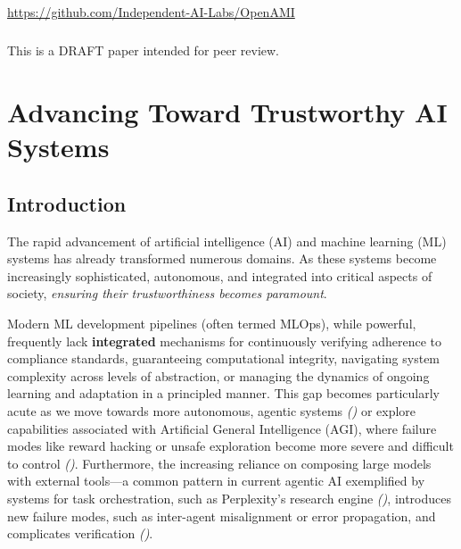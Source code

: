\documentclass[12pt,a4paper]{report}
\renewcommand{\citep}[1]{\textit{\scriptsize{(\cite{#1})}}}
\begin{document}
\begin{titlepage}
\begin{center}
			\paragraph{}
			\href{https://github.com/Independent-AI-Labs/OpenAMI}{https://github.com/Independent-AI-Labs/OpenAMI}
			\vspace{0.5cm}
			\paragraph{}
			This is a DRAFT paper intended for peer review.
		\end{center}
	\end{titlepage}
	
		\chapter{Advancing Toward Trustworthy AI Systems}
	\label{ch:introduction}
	\section{Introduction}
	The rapid advancement of artificial intelligence (AI) and machine learning (ML) systems has already transformed numerous domains. As these systems become increasingly sophisticated, autonomous, and integrated into critical aspects of society, \textit{ensuring their trustworthiness becomes paramount}.
	
	Modern ML development pipelines (often termed MLOps), while powerful, frequently lack \textbf{integrated} mechanisms for continuously verifying adherence to compliance standards, guaranteeing computational integrity, navigating system complexity across levels of abstraction, or managing the dynamics of ongoing learning and adaptation in a principled manner. This gap becomes particularly acute as we move towards more autonomous, agentic systems \citep{AgenticLandscape_Ref19} or explore capabilities associated with Artificial General Intelligence (AGI), where failure modes like reward hacking or unsafe exploration become more severe and difficult to control \citep{AdditionalCitationRef3, AdditionalCitationRef27Modern}. Furthermore, the increasing reliance on composing large models with external tools—a common pattern in current agentic AI exemplified by systems for task orchestration, such as Perplexity's research engine \citep{Perplexity2024DeepResearch}, introduces new failure modes, such as inter-agent misalignment or error propagation, and complicates verification \citep{AdditionalCitationRef7}.
	
\end{document}
